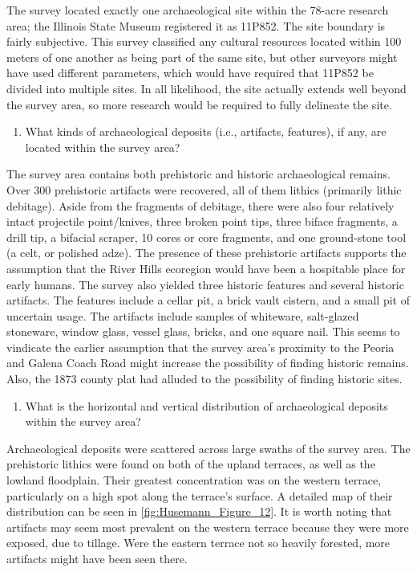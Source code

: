 The survey located exactly one archaeological site within the 78-acre research area; the Illinois State Museum registered it as 11P852. The site boundary is fairly subjective. This survey classified any cultural resources located within 100 meters of one another as being part of the same site, but other surveyors might have used different parameters, which would have required that 11P852 be divided into multiple sites. In all likelihood, the site actually extends well beyond the survey area, so more research would be required to fully delineate the site.

\begin{enumerate}[resume]
	\item What kinds of archaeological deposits (i.e., artifacts, features), if any, are located within the survey area?
\end{enumerate}

The survey area contains both prehistoric and historic archaeological remains. Over 300 prehistoric artifacts were recovered, all of them lithics (primarily lithic debitage). Aside from the fragments of debitage, there were also four relatively intact projectile point/knives, three broken point tips, three biface fragments, a drill tip, a bifacial scraper, 10 cores or core fragments, and one ground-stone tool (a celt, or polished adze). The presence of these prehistoric artifacts supports the assumption that the River Hills ecoregion would have been a hospitable place for early humans.
The survey also yielded three historic features and several historic artifacts. The features include a cellar pit, a brick vault cistern, and a small pit of uncertain usage. The artifacts include samples of whiteware, salt-glazed stoneware, window glass, vessel glass, bricks, and one square nail. This seems to vindicate the earlier assumption that the survey area’s proximity to the Peoria and Galena Coach Road might increase the possibility of finding historic remains. Also, the 1873 county plat had alluded to the possibility of finding historic sites.

\begin{enumerate}[resume]
	\item What is the horizontal and vertical distribution of archaeological deposits within the survey area?
\end{enumerate}

Archaeological deposits were scattered across large swaths of the survey area. The prehistoric lithics were found on both of the upland terraces, as well as the lowland floodplain. Their greatest concentration was on the western terrace, particularly on a high spot along the terrace’s surface. A detailed map of their distribution can be seen in \cref{fig:Husemann_Figure_12}. It is worth noting that artifacts may seem most prevalent on the western terrace because they were more exposed, due to tillage. Were the eastern terrace not so heavily forested, more artifacts might have been seen there.

